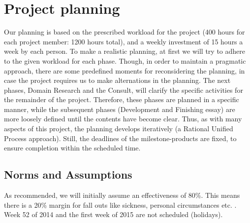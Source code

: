 \documentclass{article}
\begin{document}
\section{Project planning}
Our planning is based on the prescribed workload for the project (400 hours for each project member: 1200 hours total), and a weekly investment of 15 hours a week by each person. To make a realistic planning, at first we will try to adhere to the given workload for each phase.  Though, in order to maintain a pragmatic approach, there are some predefined moments for reconsidering the planning, in case the project requires us to make alternations in the planning. The next phases, Domain Research and the Consult, will clarify the specific activities for the remainder of the project. Therefore, these phases are planned in a specific manner, while the subsequent phases (Development and Finishing essay) are more loosely defined until the contents have become clear. Thus, as with many aspects of this project, the planning develops iteratively (a Rational Unified Process approach). Still, the deadlines of the milestone-products are fixed, to ensure completion within the scheduled time.

\subsection{Norms and Assumptions}
As recommended, we will initially assume an effectiveness of 80\%. This means there is a 20\% margin for fall outs like sickness, personal circumstances etc. . Week 52 of 2014 and the first week of 2015 are not scheduled (holidays). 
\end{document}
